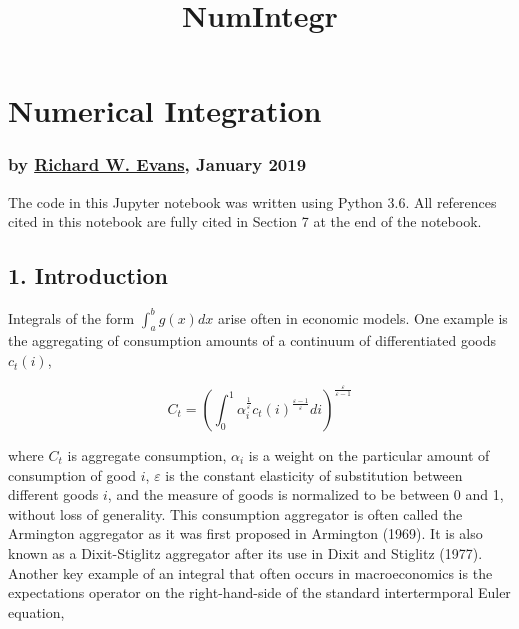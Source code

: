 \documentclass[11pt]{article}
\title{NumIntegr}
\begin{document}
    
    
    \maketitle
    
    

    
    \section{Numerical Integration}\label{numerical-integration}

\subsubsection{\texorpdfstring{by
\href{https://sites.google.com/site/rickecon/}{Richard W. Evans},
January
2019}{by Richard W. Evans, January 2019}}\label{by-richard-w.-evans-january-2019}

The code in this Jupyter notebook was written using Python 3.6. All
references cited in this notebook are fully cited in Section 7 at the
end of the notebook.

    \subsection{1. Introduction}\label{introduction}

Integrals of the form \(\int_a^b g(x)dx\) arise often in economic
models. One example is the aggregating of consumption amounts of a
continuum of differentiated goods \(c_t(i)\),

\begin{equation}\label{NumInt_EqArmAggr}
    C_t = \left(\int_0^1 \alpha_i^\frac{1}{\varepsilon}c_t(i)^\frac{\varepsilon-1}{\varepsilon}di\right)^\frac{\varepsilon}{\varepsilon-1}
\end{equation}

where \(C_t\) is aggregate consumption, \(\alpha_i\) is a weight on the
particular amount of consumption of good \(i\), \(\varepsilon\) is the
constant elasticity of substitution between different goods \(i\), and
the measure of goods is normalized to be between 0 and 1, without loss
of generality. This consumption aggregator is often called the Armington
aggregator as it was first proposed in Armington (1969). It is also
known as a Dixit-Stiglitz aggregator after its use in Dixit and Stiglitz
(1977). Another key example of an integral that often occurs in
macroeconomics is the expectations operator on the right-hand-side of
the standard intertermporal Euler equation,
\end{document}
